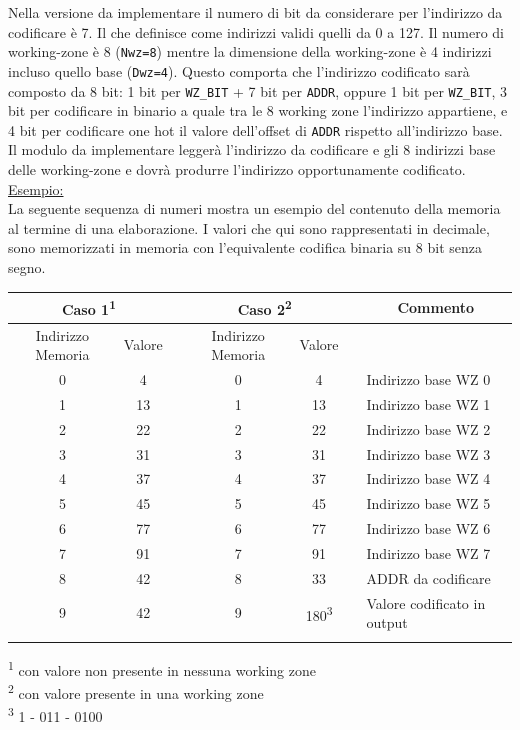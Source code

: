 \documentclass{article}
\begin{document}
Nella versione da implementare il numero di bit da considerare per l'indirizzo da codificare è 7. Il che definisce come indirizzi validi quelli da 0 a 127. Il numero di working-zone è 8 (\verb^Nwz=8^) mentre la dimensione della working-zone è 4 indirizzi incluso quello base (\verb^Dwz=4^). Questo comporta che l'indirizzo codificato sarà composto da 8 bit: 1 bit per \verb^WZ_BIT^ + 7 bit per \verb^ADDR^, oppure 1 bit per \verb^WZ_BIT^, 3 bit per codificare in binario a quale tra le 8 working zone l'indirizzo appartiene, e 4 bit per codificare one hot il valore dell'offset di \verb^ADDR^ rispetto all'indirizzo base.
Il modulo da implementare leggerà l'indirizzo da codificare e gli 8 indirizzi base delle working-zone e dovrà produrre l'indirizzo opportunamente codificato.\pagebreak\\
\underline{Esempio:}\\
La seguente sequenza di numeri mostra un esempio del contenuto della memoria al termine di una elaborazione. I valori che qui sono rappresentati in decimale, sono memorizzati in memoria con l'equivalente codifica binaria su 8 bit senza segno.

\begin{center}
\begin{tabular}{ccccccl}
\hline
\multicolumn{2}{c}{\textbf{Caso 1\textsuperscript{1}}} &  & \multicolumn{2}{c}{\textbf{Caso 2\textsuperscript{2}}} &  & \multicolumn{1}{c}{Commento} \\ \hline
Indirizzo Memoria & Valore &  & Indirizzo Memoria & Valore &  & \multicolumn{1}{c}{} \\
0 & 4 &  & 0 & 4 &  & Indirizzo base WZ 0 \\
1 & 13 &  & 1 & 13 &  & Indirizzo base WZ 1 \\
2 & 22 &  & 2 & 22 &  & Indirizzo base WZ 2 \\
3 & 31 &  & 3 & 31 &  & Indirizzo base WZ 3 \\
4 & 37 &  & 4 & 37 &  & Indirizzo base WZ 4 \\
5 & 45 &  & 5 & 45 &  & Indirizzo base WZ 5 \\
6 & 77 &  & 6 & 77 &  & Indirizzo base WZ 6 \\
7 & 91 &  & 7 & 91 &  & Indirizzo base WZ 7 \\
8 & 42 &  & 8 & 33 &  & ADDR da codificare \\
9 & 42 &  & 9 & 180\textsuperscript{3}&  & Valore codificato in output \\
\multicolumn{1}{l}{} & \multicolumn{1}{l}{} & \multicolumn{1}{l}{} & \multicolumn{1}{l}{} & \multicolumn{1}{l}{} & \multicolumn{1}{l}{} &  \\ \hline
\end{tabular}
\end{center}
\begin{footnotesize}
\textsuperscript{1} con valore non presente in nessuna working zone\\
\textsuperscript{2} con valore presente in una working zone\\
\textsuperscript{3} 1 - 011 - 0100
\end{footnotesize}
\end{document}
